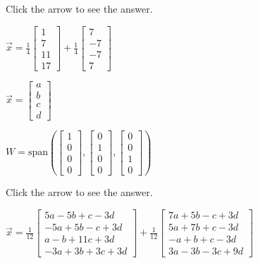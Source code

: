 \documentclass{ximera}
\begin{document}
\begin{problem}
\begin{problem}
Click the arrow to see the answer.
\begin{expandable}
$\vec{x}= \frac{1}{4}\begin{bmatrix}1\\ 7\\ 11\\ 17\end{bmatrix} + \frac{1}{4}\begin{bmatrix}7\\ -7\\ -7\\ 7\end{bmatrix}$
\end{expandable}
\end{problem}

\begin{problem}\label{OrthoDecomp5}
$\vec{x} = \begin{bmatrix}a\\ b\\ c\\ d\end{bmatrix}$

$W = \mbox{span}\left(\begin{bmatrix}1\\ 0\\ 0\\ 0\end{bmatrix}, \begin{bmatrix}0\\ 1\\ 0\\ 0\end{bmatrix}, \begin{bmatrix}0\\ 0\\ 1\\ 0\end{bmatrix}\right)$

Click the arrow to see the answer.
\begin{expandable}
$\vec{x} = \frac{1}{12}\begin{bmatrix}5a - 5b + c - 3d\\ -5a + 5b - c + 3d\\ a - b + 11c + 3d\\ -3a + 3b + 3c + 3d\end{bmatrix} + \frac{1}{12}\begin{bmatrix}7a + 5b - c + 3d\\ 5a + 7b + c - 3d\\ -a + b + c -3d\\ 3a - 3b - 3c + 9d\end{bmatrix}$
\end{expandable}
\end{problem}

\end{problem}
\end{document}
